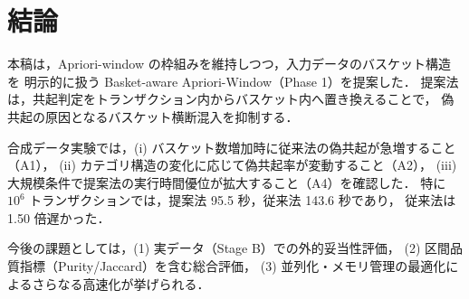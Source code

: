 \section{結論}
\label{sec:conclusion}

本稿は，Apriori-window の枠組みを維持しつつ，入力データのバスケット構造を
明示的に扱う Basket-aware Apriori-Window（Phase 1）を提案した．
提案法は，共起判定をトランザクション内からバスケット内へ置き換えることで，
偽共起の原因となるバスケット横断混入を抑制する．

合成データ実験では，(i) バスケット数増加時に従来法の偽共起が急増すること（A1），
(ii) カテゴリ構造の変化に応じて偽共起率が変動すること（A2），
(iii) 大規模条件で提案法の実行時間優位が拡大すること（A4）を確認した．
特に $10^6$ トランザクションでは，提案法 95.5 秒，従来法 143.6 秒であり，
従来法は 1.50 倍遅かった．

今後の課題としては，(1) 実データ（Stage B）での外的妥当性評価，
(2) 区間品質指標（Purity/Jaccard）を含む総合評価，
(3) 並列化・メモリ管理の最適化によるさらなる高速化が挙げられる．
